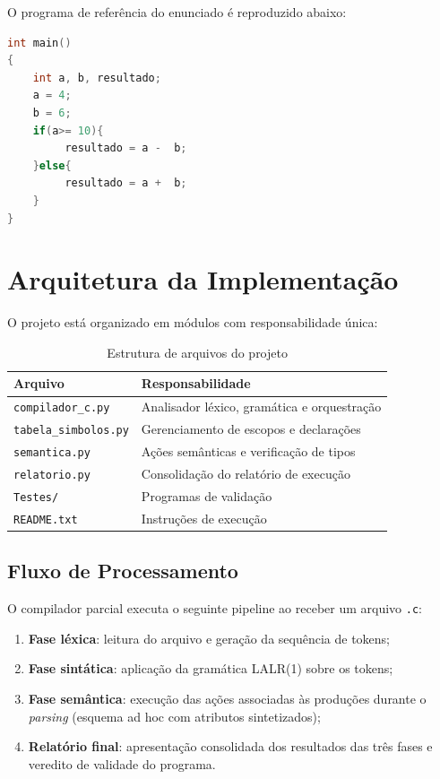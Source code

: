 \documentclass[12pt,a4paper]{article}
\begin{document}
O programa de referência do enunciado é reproduzido abaixo:

\begin{lstlisting}[style=codigo, language=C]
int main()
{
    int a, b, resultado;
    a = 4;
    b = 6;
    if(a>= 10){
         resultado = a -  b;
    }else{
         resultado = a +  b;
    }
}
\end{lstlisting}

\section{Arquitetura da Implementação}

O projeto está organizado em módulos com responsabilidade única:

\begin{table}[h]
  \centering
  \caption{Estrutura de arquivos do projeto}
  \begin{tabular}{@{}ll@{}}
    \toprule
    \textbf{Arquivo} & \textbf{Responsabilidade} \\
    \midrule
    \texttt{compilador\_c.py}   & Analisador léxico, gramática e orquestração \\
    \texttt{tabela\_simbolos.py} & Gerenciamento de escopos e declarações \\
    \texttt{semantica.py}     & Ações semânticas e verificação de tipos \\
    \texttt{relatorio.py}     & Consolidação do relatório de execução \\
    \texttt{Testes/}           & Programas de validação \\
    \texttt{README.txt}         & Instruções de execução \\
    \bottomrule
  \end{tabular}
\end{table}

\subsection{Fluxo de Processamento}

O compilador parcial executa o seguinte pipeline ao receber um arquivo \texttt{.c}:

\begin{enumerate}
  \item \textbf{Fase léxica}: leitura do arquivo e geração da sequência de tokens;
  \item \textbf{Fase sintática}: aplicação da gramática LALR(1) sobre os tokens;
  \item \textbf{Fase semântica}: execução das ações associadas às produções durante
        o \textit{parsing} (esquema ad hoc com atributos sintetizados);
  \item \textbf{Relatório final}: apresentação consolidada dos resultados das três
        fases e veredito de validade do programa.
\end{enumerate}
\end{document}
